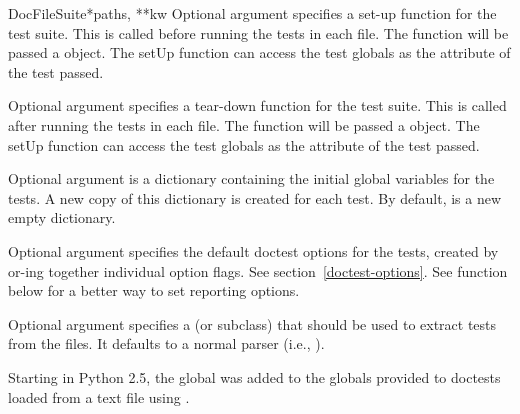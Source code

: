 \begin{funcdesc}{DocFileSuite}{*paths, **kw}
  Optional argument  specifies a set-up function for
  the test suite.  This is called before running the tests in each
  file.  The  function will be passed a 
  object.  The setUp function can access the test globals as the
   attribute of the test passed.

  Optional argument  specifies a tear-down function
  for the test suite.  This is called after running the tests in each
  file.  The  function will be passed a 
  object.  The setUp function can access the test globals as the
   attribute of the test passed.

  Optional argument  is a dictionary containing the
  initial global variables for the tests.  A new copy of this
  dictionary is created for each test.  By default,  is
  a new empty dictionary.

  Optional argument  specifies the default
  doctest options for the tests, created by or-ing together
  individual option flags.  See section~\ref{doctest-options}.
  See function  below for
  a better way to set reporting options.

  Optional argument  specifies a  (or
  subclass) that should be used to extract tests from the files.  It
  defaults to a normal parser (i.e., ).


  Starting in Python 2.5, the global  was added to the
  globals provided to doctests loaded from a text file using
  .
\end{funcdesc}

